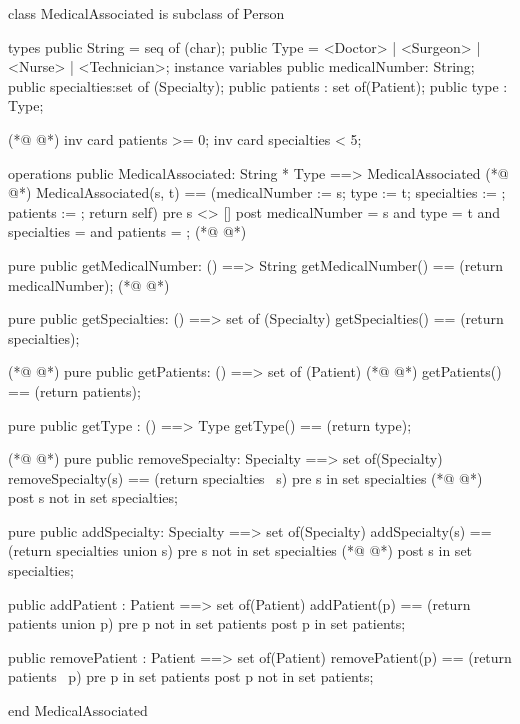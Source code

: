 \begin{vdmpp}[breaklines=true]
class MedicalAssociated is subclass of Person

types
 public String = seq of (char);
 public Type = <Doctor> | <Surgeon> | <Nurse> | <Technician>;
instance variables
  public medicalNumber: String;
  public specialties:set of (Specialty);
  public patients : set of(Patient);
 public type : Type;
 
(*@
\label{MedicalAssociated:12}
@*)
 inv card patients >= 0;
  inv card specialties < 5;

operations
 public MedicalAssociated: String * Type ==> MedicalAssociated
(*@
\label{getMedicalNumber:17}
@*)
  MedicalAssociated(s, t) == (medicalNumber := s; type := t; specialties := {}; patients := {}; return self)
 pre s <> []
 post medicalNumber = s and type = t and specialties = {} and patients = {};
(*@
\label{getSpecialties:20}
@*)
 
 pure public getMedicalNumber: () ==> String
  getMedicalNumber() == (return medicalNumber);
(*@
\label{removeSpecialty:23}
@*)
 
 pure public getSpecialties: () ==> set of (Specialty)
  getSpecialties() == (return specialties);
 
(*@
\label{getPatients:27}
@*)
 pure public getPatients: () ==> set of (Patient)
(*@
\label{addSpecialty:28}
@*)
  getPatients() == (return patients);
  
 pure public getType : () ==> Type
  getType() == (return type);
  
(*@
\label{getType:33}
@*)
 pure public removeSpecialty: Specialty ==> set of(Specialty)
  removeSpecialty(s) == (return specialties \ {s})
 pre s in set specialties
(*@
\label{addPatient:36}
@*)
 post s not in set specialties;
  
 pure public addSpecialty: Specialty ==> set of(Specialty)
  addSpecialty(s) == (return specialties union {s})
 pre s not in set specialties
(*@
\label{removePatient:41}
@*)
 post s in set specialties;
 
 public addPatient : Patient ==> set of(Patient)
  addPatient(p) == (return patients union {p})
 pre p not in set patients
 post p in set patients;
 
 public removePatient : Patient ==> set of(Patient)
  removePatient(p) == (return patients \ {p})
 pre p in set patients
 post p not in set patients;

end MedicalAssociated
\end{vdmpp}
